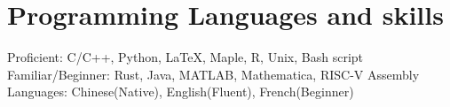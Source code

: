 \section{\sc Programming Languages and skills}
Proficient: C/C++, Python, \LaTeX, Maple, R, Unix, Bash script\\
Familiar/Beginner: Rust, Java, MATLAB, Mathematica, RISC-V Assembly\\
Languages: Chinese(Native), English(Fluent), French(Beginner)
\endinput
